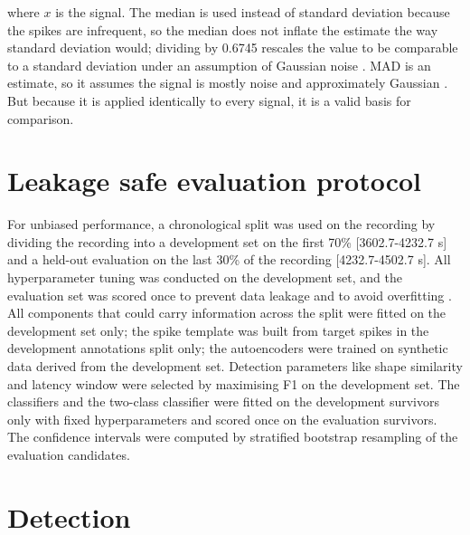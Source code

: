 \documentclass[ %
                    author={Rzan Alkabier},
                    supervisor={Dr. Zahraa Abdallah},
                    degree={MSc},
                     title={Denoising Extracellular Recording for Spike Detection and Classification on Single Channels},
                    subtitle={Does denoising improve detection and classification performance?},
                      type={},
                      year={2026}]{dissertation}
\begin{document}
where $x$ is the signal. The median is used instead of standard deviation because the spikes are infrequent, so the median does not inflate the estimate the way standard deviation would; dividing by 0.6745 rescales the value to be comparable to a standard deviation under an assumption of Gaussian noise \cite{drebitz_optimizing_2019}. MAD is an estimate, so it assumes the signal is mostly noise and approximately Gaussian \cite{coupe_robust_2010}. But because it is applied identically to every signal, it is a valid basis for comparison.
\section{Leakage safe evaluation protocol}
For unbiased performance, a chronological split was used on the recording by dividing the recording into a development set on the first 70\% [3602.7-4232.7 s] and a held-out evaluation on the last 30\% of the recording [4232.7-4502.7 s]. All hyperparameter tuning was conducted on the development set, and the evaluation set was scored once to prevent data leakage and to avoid overfitting \cite{rashid_spike_2025}. All components that could carry information across the split were fitted on the development set only; the spike template was built from target spikes in the development annotations split only; the autoencoders were trained on synthetic data derived from the development set. Detection parameters like shape similarity and latency window were selected by maximising F1 on the development set. The classifiers and the two-class classifier were fitted on the development survivors only with fixed hyperparameters and scored once on the evaluation survivors. The confidence intervals were computed by stratified bootstrap resampling of the evaluation candidates.  

\section{Detection}
\end{document}
